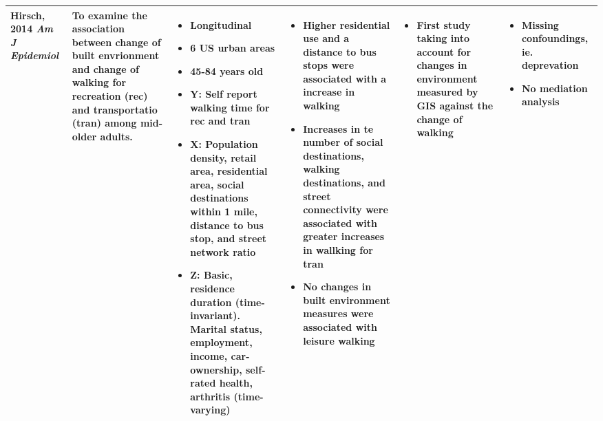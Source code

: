 \documentclass{article}
\begin{document}
\begin{longtable}[ht!]{ m{2cm} m{4cm} m{6cm} m{5cm} m{4cm} m{3cm} }
	Hirsch, 2014 \textit{Am J Epidemiol} &
	To examine the association between change of built envrionment and change of walking for recreation (rec) and transportatio (tran) among mid-older adults. &
	\begin{itemize}[noitemsep,topsep=0pt] \item Longitudinal \item 6 US urban areas \item 45-84 years old \item Y: Self report walking time for rec and tran \item X: Population density, retail area, residential area, social destinations within 1 mile, distance to bus stop, and street network ratio \item Z: Basic, residence duration (time-invariant). Marital status, employment, income, car-ownership, self-rated health, arthritis (time-varying) 
	\end{itemize} &
	\begin{itemize}[noitemsep,topsep=0pt] \item Higher residential use and a distance to bus stops were associated with a increase in walking \item Increases in te number of social destinations, walking destinations, and street connectivity were associated with greater increases in wallking for tran \item No changes in built environment measures were associated with leisure walking
	\end{itemize} &
	\begin{itemize}[noitemsep,topsep=0pt] \item First study taking into account for changes in environment measured by GIS against the change of walking
	\end{itemize} &
	\begin{itemize}[noitemsep,topsep=0pt] \item Missing confoundings, ie. deprevation \item No mediation analysis
	\end{itemize} \\
	\hline


\end{longtable}
\end{document}
